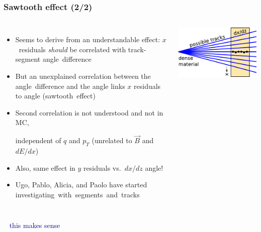 \documentclass[compress]{beamer}
\begin{document}
\begin{frame}
\frametitle{Sawtooth effect (2/2)}

\begin{columns}
\begin{itemize}\setlength{\itemsep}{0.05 cm}
\item Seems to derive from an understandable effect: \mbox{$x$ residuals\hspace{-1 cm}}
  {\it should} be correlated with track-segment \mbox{angle difference\hspace{-1 cm}}
\item But an unexplained correlation between the \mbox{angle difference\hspace{-0.75 cm}} and
  the angle links $x$ residuals to angle \mbox{(sawtooth effect)\hspace{-1 cm}}
\item Second correlation is not understood and not in MC,

independent of $q$ and $p_T$ (unrelated to $\vec{B}$ and $dE/dx$)

\item Also, same effect in $y$ residuals vs.\ $dx/dz$ angle!

\item Ugo, Pablo, Alicia, and Paolo have started \mbox{investigating with segments and tracks\hspace{-5 cm}}

\end{itemize}

\includegraphics[width=\linewidth]{understandable_correlation_diagram.pdf}
\end{columns}

\vfill
\begin{columns}
\mbox{ } \hfill \textcolor{darkblue}{this makes sense} \hfill \mbox{ }


\end{columns}
\end{frame}
\end{document}
